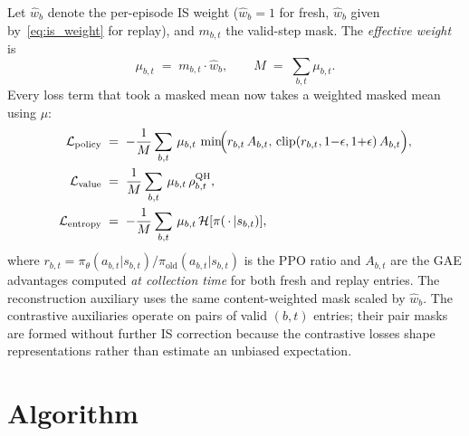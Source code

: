 \documentclass[11pt]{article}
\begin{document}
Let $\hat w_b$ denote the per-episode IS weight ($\hat w_b = 1$ for
fresh, $\hat w_b$ given by~\eqref{eq:is_weight} for replay), and
$m_{b,t}$ the valid-step mask. The \emph{effective weight} is
\begin{equation}
\mu_{b,t} \;=\; m_{b,t}\cdot \hat w_b,
\qquad
M \;=\; \sum_{b,t} \mu_{b,t}.
\end{equation}
Every loss term that took a masked mean now takes a weighted
masked mean using $\mu$:
\begin{align}
\mathcal{L}_{\text{policy}} &\;=\;
- \frac{1}{M}\sum_{b,t}\, \mu_{b,t}\,
\min\!\Bigl(r_{b,t}\,A_{b,t},\, \mathrm{clip}(r_{b,t}, 1{-}\epsilon, 1{+}\epsilon)\,A_{b,t}\Bigr),\\
\mathcal{L}_{\text{value}} &\;=\; \frac{1}{M}\sum_{b,t}\, \mu_{b,t}\, \rho^{\text{QH}}_{b,t},\\
\mathcal{L}_{\text{entropy}} &\;=\; -\frac{1}{M}\sum_{b,t}\, \mu_{b,t}\, \mathcal{H}[\pi(\,\cdot\,|s_{b,t})],
\end{align}
where $r_{b,t} = \pi_{\theta}(a_{b,t}|s_{b,t})/\pi_{\text{old}}(a_{b,t}|s_{b,t})$
is the PPO ratio and $A_{b,t}$ are the GAE advantages computed
\emph{at collection time} for both fresh and replay entries. The
reconstruction auxiliary uses the same content-weighted mask scaled
by $\hat w_b$. The contrastive auxiliaries operate on pairs of valid
$(b,t)$ entries; their pair masks are formed without further IS
correction because the contrastive losses shape representations
rather than estimate an unbiased expectation.

\section{Algorithm}
\end{document}
